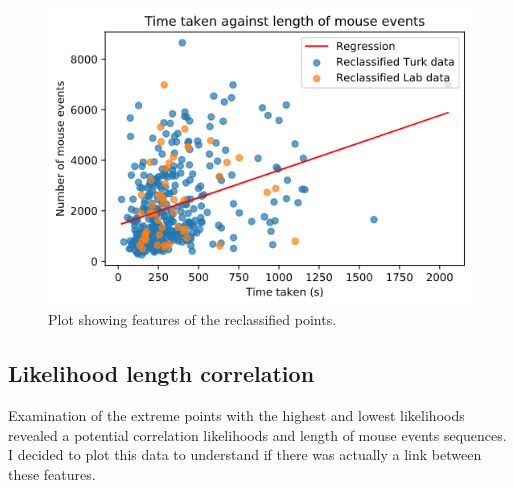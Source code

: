 \documentclass{article}
\begin{document}
\begin{figure}[ht!]
    \centering
    \includegraphics[scale=0.5]{Images/TimeTaken-Mouse-Events-Reclassified.png}
    \caption{Plot showing features of the reclassified points. }
    \label{fig:Reclassified-Scatterplot}
\end{figure}

\subsection{Likelihood length correlation}

Examination of the extreme points with the highest and lowest likelihoods revealed a potential correlation likelihoods and length of mouse events sequences.
I decided to plot this data to understand if there was actually a link between these features.
\end{document}
